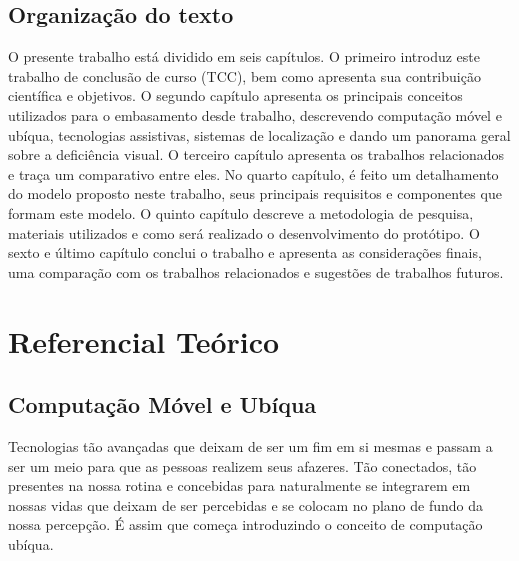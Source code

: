 \documentclass[english,brazilian]{UNISINOSmonografia}
\begin{document}
	\section{Organização do texto}
O presente trabalho está dividido em seis capítulos. O primeiro introduz este trabalho de conclusão de curso (TCC), bem como apresenta sua contribuição científica e objetivos.
O segundo capítulo apresenta os principais conceitos utilizados para o embasamento desde trabalho, descrevendo computação móvel e ubíqua, tecnologias assistivas, sistemas de localização e dando um panorama geral sobre a deficiência visual.
O terceiro capítulo apresenta os trabalhos relacionados e traça um comparativo entre eles.
No quarto capítulo, é feito um detalhamento do modelo proposto neste trabalho, seus principais requisitos e componentes que formam este modelo.
O quinto capítulo descreve a metodologia de pesquisa, materiais utilizados e como será realizado o desenvolvimento do protótipo.
O sexto e último capítulo conclui o trabalho e apresenta as considerações finais, uma comparação com os trabalhos relacionados e sugestões de trabalhos futuros.

\chapter{Referencial Teórico}

	\section{Computação Móvel e Ubíqua}
Tecnologias tão avançadas que deixam de ser um fim em si mesmas e passam a ser um meio para que as pessoas realizem seus afazeres. Tão conectados, tão presentes na nossa rotina e concebidas para naturalmente se integrarem em nossas vidas que deixam de ser percebidas e se colocam no plano de fundo da nossa percepção. É assim que  começa introduzindo o conceito de computação ubíqua. 
\end{document}
